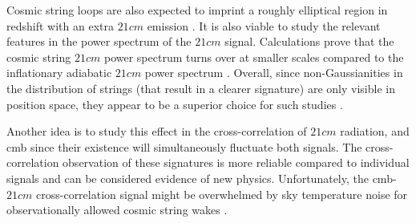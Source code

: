 \documentclass[12pt, TexShade, letterpaper]{report}
\begin{document}
Cosmic string loops are also expected to imprint a roughly elliptical region in redshift with an extra $21cm$ emission \cite{string_loop_robert}.
It is also viable to study the relevant features in the power spectrum of the $21cm$ signal. Calculations prove that the cosmic string $21cm$ power spectrum turns over at smaller scales compared to the inflationary adiabatic $21cm$ power spectrum \cite{super_string}. Overall, since non-Gaussianities in the distribution of strings (that result in a clearer signature) are only visible in position space, they appear to be a superior choice for such studies \cite{cosmic_string_brandenberger}.\par

Another idea is to study this effect in the cross-correlation of $21cm$ radiation, and \gls{cmb} since their existence will simultaneously fluctuate both signals. The cross-correlation observation of these signatures is more reliable compared to individual signals and can be considered evidence of new physics. Unfortunately, the \gls{cmb}-$21cm$ cross-correlation signal might be overwhelmed by sky temperature noise for observationally allowed cosmic string wakes \cite{corre_21cm_cmb}.
\end{document}
